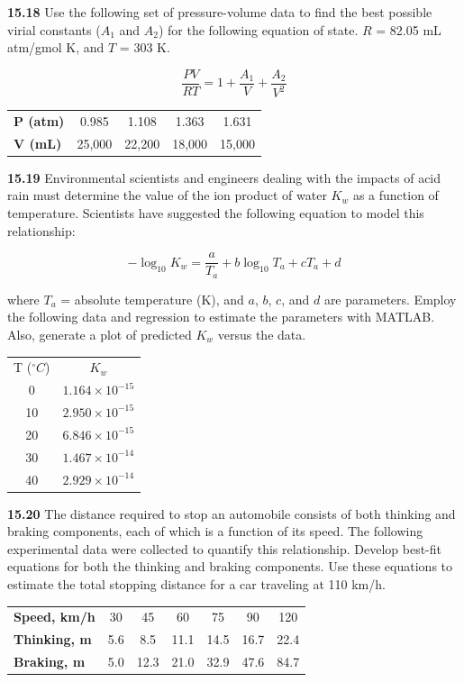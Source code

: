 \documentclass[../main.tex]{subfiles}
\begin{document}
\begin{multicols}{2}
	\noindent\textbf{15.18}  Use the following set of pressure-volume data to find
	the best possible virial constants ($A_1$ and $A_2$) for the following equation of state. $R$ = 82.05 mL atm/gmol K, and $T$ =
	 303 K.

	$$
		\frac{P V}{R T}=1 + \frac{A_1}{V}+\frac{A_2}{V^2} 
	$$
	
	\noindent
	\begin{tabular}{l c c c c }
		\textbf{P (atm)} &		0.985 &		 1.108 &		 1.363 &		 1.631 \\	 
		\textbf{V (mL)} &		 25,000 &		 22,200 &		 18,000 &		 15,000
	\end{tabular}

	\noindent\textbf{15.19} Environmental scientists and engineers dealing with
	the impacts of acid rain must determine the value of the
	ion product of water $K_w$ as a function of temperature. Scientists have suggested the following equation to model this
	relationship:

	$$
		- \log_10 K_w = \frac{a}{T_a} + b \log_10 T_a + c T_a +d
	$$

	\noindent where $T_a$ = absolute temperature (K), and $a$, $b$, $c$, and $d$ are
	parameters. Employ the following data and regression to estimate the parameters with MATLAB. Also, generate a
	plot of predicted $K_w$ versus the data.

	\noindent
	\begin{tabular}{c c}
		T ($^\circ C$) & $K_w$ \\
		0  & $1.164 \times 10^{-15}$ \\
		10 & $2.950 \times 10^{-15}$ \\
		20 & $6.846 \times 10^{-15}$ \\
		30 & $1.467 \times 10^{-14}$ \\
		40 & $2.929 \times 10^{-14}$ \\
	\end{tabular}

	\noindent\textbf{15.20} The distance required to stop an automobile consists
	of both thinking and braking components, each of which is a
	function of its speed. The following experimental data were
	collected to quantify this relationship. Develop best-fit equations for both the thinking and braking components. Use
	these equations to estimate the total stopping distance for a
	car traveling at 110 km/h.

	\begin{tabular}{l c c c c c c} 
		\textbf{Speed, km/h} &  30 &  45 &  60 &  75 &  90 &  120 \\
		\textbf{Thinking, m} &  5.6 &  8.5 &  11.1 &  14.5 &  16.7 &  22.4 \\
		\textbf{Braking, m} &  5.0 &  12.3 &  21.0 &  32.9 &  47.6 &  84.7
	\end{tabular}


\end{multicols}
\end{document}

